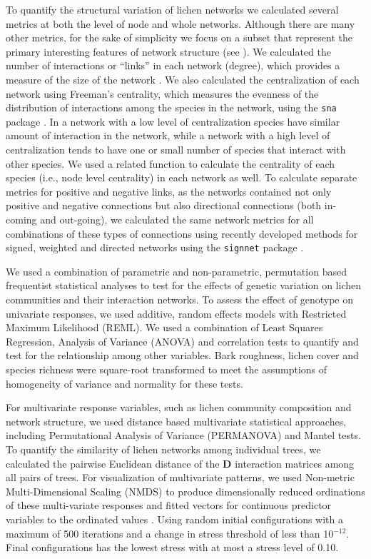 \documentclass[fleqn,12pt]{olplainarticle}
\begin{document}
To quantify the structural variation of lichen networks we calculated
several metrics at both the level of node and whole networks. Although
there are many other metrics, for the sake of simplicity we focus on a
subset that represent the primary interesting features of network
structure (see \cite{Lau2017a}). We calculated the number of
interactions or ``links'' in each network (degree), which provides a
measure of the size of the network \citep{Lau2016afix,
  Borrett2014EnaR:Analysis}. We also calculated the centralization of
each network using Freeman's centrality, which measures the evenness
of the distribution of interactions among the species in the network,
using the \texttt{sna} package \citep{sna}. In a network with a low
level of centralization species have similar amount of interaction in
the network, while a network with a high level of centralization tends
to have one or small number of species that interact with other
species. We used a related function to calculate the centrality of
each species (i.e., node level centrality) in each network as well. To
calculate separate metrics for positive and negative links, as the
networks contained not only positive and negative connections but also
directional connections (both in-coming and out-going), we calculated
the same network metrics for all combinations of these types of
connections using recently developed methods for signed, weighted and
directed networks \citep{Everett2014NetworksTies} using the
\texttt{signnet} package \citep{signnet}.

We used a combination of parametric and non-parametric, permutation
based frequentist statistical analyses to test for the effects of
genetic variation on lichen communities and their interaction
networks. To assess the effect of genotype on univariate responses, we
used additive, random effects models with Restricted Maximum
Likelihood (REML). We used a combination of Least Squares Regression,
Analysis of Variance (ANOVA) and correlation tests to quantify and
test for the relationship among other variables. Bark roughness,
lichen cover and species richness were square-root transformed to meet
the assumptions of homogeneity of variance and normality for these
tests.

For multivariate response variables, such as lichen community
composition and network structure, we used distance based multivariate
statistical approaches, including Permutational Analysis of Variance
(PERMANOVA) and Mantel tests. To quantify the similarity of lichen
networks among individual trees, we calculated the pairwise Euclidean
distance of the $\mathbf{D}$ interaction matrices among all pairs of
trees. For visualization of multivariate patterns, we used Non-metric
Multi-Dimensional Scaling (NMDS) \citep{ecodist} to produce
dimensionally reduced ordinations of these multi-variate responses and
fitted vectors for continuous predictor variables to the ordinated
values \citep{vegan}. Using random initial configurations with a
maximum of 500 iterations and a change in stress threshold of less
than 10$^{-12}$. Final configurations has the lowest stress with at
most a stress level of 0.10.
\end{document}
